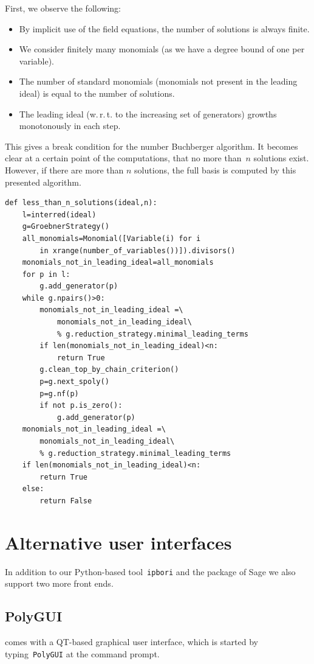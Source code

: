First, we observe the following:
\begin{itemize}
    \item By implicit use of the field equations, the number of solutions is always finite.
    \item We consider finitely many monomials (as we have a degree bound of one per variable).
    \item The number of standard monomials (monomials not present in the leading ideal) is equal to the number of solutions.
    \item The leading ideal (w.\,r.\,t. to the increasing set of generators) growths monotonously in each step.
\end{itemize}
This gives a break condition for the number Buchberger algorithm. It becomes
clear at a certain point of the computations,  that no more than~$n$ solutions exist.
However, if there are more than $n$ solutions, the full \Groebner basis is computed by this presented algorithm.
\begin{lstlisting}
def less_than_n_solutions(ideal,n):
    l=interred(ideal)
    g=GroebnerStrategy()
    all_monomials=Monomial([Variable(i) for i 
        in xrange(number_of_variables())]).divisors()
    monomials_not_in_leading_ideal=all_monomials
    for p in l:
        g.add_generator(p)
    while g.npairs()>0:
        monomials_not_in_leading_ideal =\
            monomials_not_in_leading_ideal\
            % g.reduction_strategy.minimal_leading_terms
        if len(monomials_not_in_leading_ideal)<n:
            return True
        g.clean_top_by_chain_criterion()
        p=g.next_spoly()
        p=g.nf(p)
        if not p.is_zero():
            g.add_generator(p)
    monomials_not_in_leading_ideal =\
        monomials_not_in_leading_ideal\
        % g.reduction_strategy.minimal_leading_terms
    if len(monomials_not_in_leading_ideal)<n:
        return True
    else:
        return False
\end{lstlisting}

\section{Alternative user interfaces}

In addition to our Python-based tool~\texttt{ipbori} and the \PolyBoRi
package of Sage  we also support two more front ends.

\subsection{PolyGUI}
\PolyBoRi comes with a QT-based  graphical user interface, which is started
by typing~\texttt{PolyGUI} at the command prompt.

